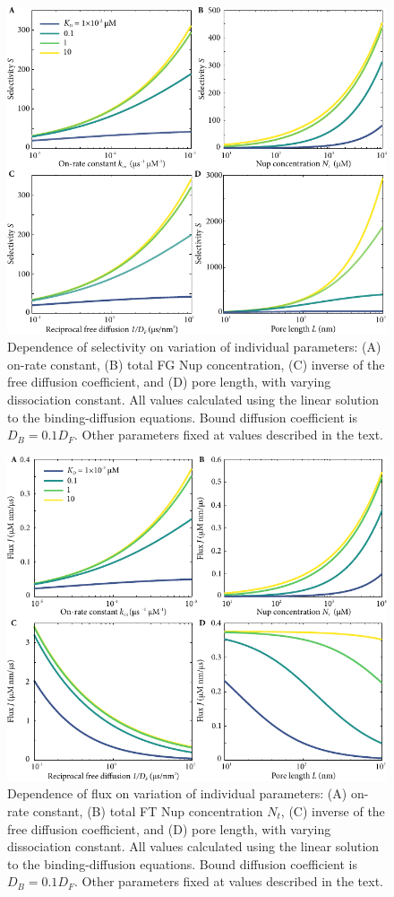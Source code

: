 \begin{figure}
\centering
\includegraphics[width=0.8\linewidth]{figs/ch02/parameter-variations.pdf}
\caption[Dependence of selectivity on model parameters.]{Dependence of selectivity on variation of individual
  parameters: (A) on-rate constant, (B) total FG Nup concentration, (C) inverse of the free diffusion coefficient, and (D) pore
  length, with varying dissociation constant. All values calculated using the linear solution to the binding-diffusion equations.  Bound diffusion coefficient is $D_B = 0.1D_F$. Other parameters fixed at values described in the text.}
\label{fig:parameter-variations}
\end{figure}

\begin{figure}
\centering
\includegraphics[width=0.8\linewidth]{figs/ch02/parameter-variations-abs-flux.pdf}
\caption[Dependence of absolute flux on model parameters.]{Dependence of flux on variation of individual parameters: (A) on-rate constant, (B) total FT Nup concentration $N_t$, (C) inverse
  of the free diffusion coefficient, and (D) pore length, with varying
  dissociation constant. All values calculated using the linear solution to the binding-diffusion equations. Bound diffusion coefficient is $D_B = 0.1D_F$. Other parameters fixed at values described in the text.}
\label{fig:parameter-variations-abs-flux}
\end{figure}

